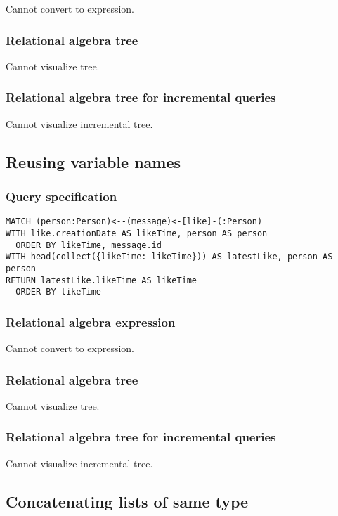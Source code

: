 Cannot convert to expression.

\subsubsection*{Relational algebra tree}

Cannot visualize tree.

\subsubsection*{Relational algebra tree for incremental queries}

Cannot visualize incremental tree.

\subsection{Reusing variable names}

\subsubsection*{Query specification}

\begin{lstlisting}
MATCH (person:Person)<--(message)<-[like]-(:Person)
WITH like.creationDate AS likeTime, person AS person
  ORDER BY likeTime, message.id
WITH head(collect({likeTime: likeTime})) AS latestLike, person AS person
RETURN latestLike.likeTime AS likeTime
  ORDER BY likeTime
\end{lstlisting}

\subsubsection*{Relational algebra expression}

Cannot convert to expression.

\subsubsection*{Relational algebra tree}

Cannot visualize tree.

\subsubsection*{Relational algebra tree for incremental queries}

Cannot visualize incremental tree.

\subsection{Concatenating lists of same type}


